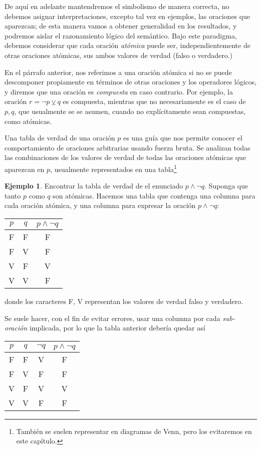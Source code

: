 \documentclass{book}
\theoremstyle{definition}
\newtheorem{ejm}{Ejemplo}[chapter]
\begin{document}
De aquí en adelante mantendremos el simbolismo de manera correcta, no debemos asignar interpretaciones, excepto tal vez en ejemplos, las oraciones que aparezcan; de esta manera vamos a obtener generalidad en los resultados, y podremos aislar el razonamiento lógico del semántico.
Bajo este paradigma, debemos considerar que cada oración \emph{atómica} puede ser, independientemente de otras oraciones atómicas, sus ambos valores de verdad (falso o verdadero.)

En el párrafo anterior, nos referimos a una oración atómica si no se puede descomponer propiamente en términos de otras oraciones y los operadores lógicos, y diremos que una oración es \emph{compuesta} en caso contrario.
Por ejemplo, la oración $r = \neg p \veebar q$ es compuesta, mientras que no necesariamente es el caso de $p,q$, que usualmente se se asumen, cuando no explícitamente sean compuestas, como atómicas.

Una tabla de verdad de una oración $p$ es una guía que nos permite conocer el comportamiento de oraciones arbitrarias usando fuerza bruta.
Se analizan todas las combinaciones de los valores de verdad de todas las oraciones atómicas que aparezcan en $p$, usualmente representados en una tabla\footnote{También se suelen representar en diagramas de Venn, pero los evitaremos en este capítulo.}
\begin{ejm}
	Encontrar la tabla de verdad de el enunciado $p \wedge \neg q$. Suponga que tanto $p$ como $q$ son atómicas.
	Hacemos una tabla que contenga una columna para cada oración atómica, y una columna para expresar la oración $p \wedge \neg q$:

	\begin{center}\begin{tabular}{|c|c|c|}
		\hline
		$p$& $q$ & $p \wedge \neg q$ \\
		\hline \hline
		F & F & F \\
		\hline
		F & V & F \\
		\hline
		V & F & V \\
		\hline
		V & V & F \\
		\hline
	\end{tabular}\end{center}
	donde los caracteres F, V representan los valores de verdad falso y verdadero.
	
	Se suele hacer, con el fin de evitar errores, usar una columna por cada \emph{sub-oración} implicada, por lo que la tabla anterior debería quedar así
	\begin{center}\begin{tabular}{|c|c|c|c|}
		\hline
		$p$& $q$ & $\neg q$ &$p \wedge \neg q$ \\
		\hline \hline
		F & F & V & F \\
		\hline
		F & V & F & F \\
		\hline
		V & F & V & V \\
		\hline
		V & V & F & F \\
		\hline
\end{tabular}\end{center} 
\end{ejm}
\end{document}
